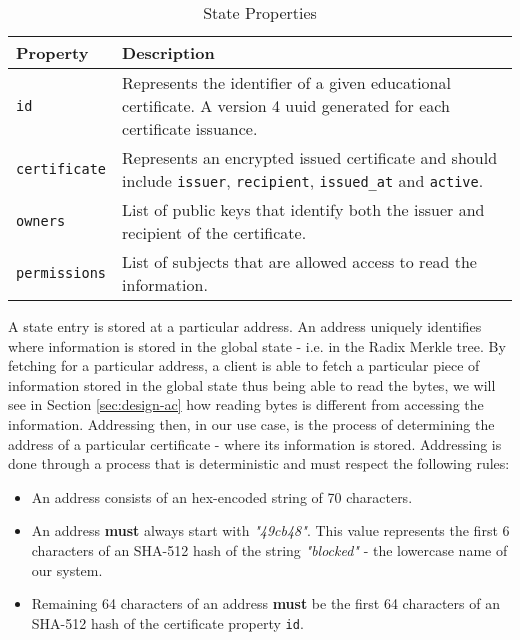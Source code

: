 {
\renewcommand{\arraystretch}{1.5}%
\begin{table}[htb]
	\centering
	\caption{State Properties}
	\label{tab:stateProperties}
	\begin{tabular}{p{}|p{}}
		\hline \bf Property  & \bf Description                                                                                                                             \\ \hline
		\texttt{id}          & Represents the identifier of a given educational certificate. A version 4 \gls{uuid} generated for each certificate issuance.               \\ \hline
		\texttt{certificate} & Represents an encrypted issued certificate and should include \texttt{issuer}, \texttt{recipient}, \texttt{issued\_at} and \texttt{active}. \\ \hline
		\texttt{owners}      & List of public keys that identify both the issuer and recipient of the certificate.                                                         \\ \hline
		\texttt{permissions} & List of subjects that are allowed access to read the information.                                                                           \\
		\hline
	\end{tabular}
\end{table}
}

A state entry is stored at a particular address. An address uniquely identifies where information is stored in the global state - i.e. in the Radix Merkle tree. By fetching for a particular address, a client is able to fetch a particular piece of information stored in the global state thus being able to read the bytes, we will see in Section \ref{sec:design-ac} how reading bytes is different from accessing the information. Addressing then, in our use case, is the process of determining the address of a particular certificate - where its information is stored. Addressing is done through a process that is deterministic and must respect the following rules:

\begin{itemize}
	\item An address consists of an hex-encoded string of 70 characters.
	\item An address \textbf{must} always start with \emph{"49cb48"}. This value represents the first 6 characters of an SHA-512 hash of the string \emph{"blocked"} - the lowercase name of our system.
	\item Remaining 64 characters of an address \textbf{must} be the first 64 characters of an SHA-512 hash of the certificate property \texttt{id}.
\end{itemize}

